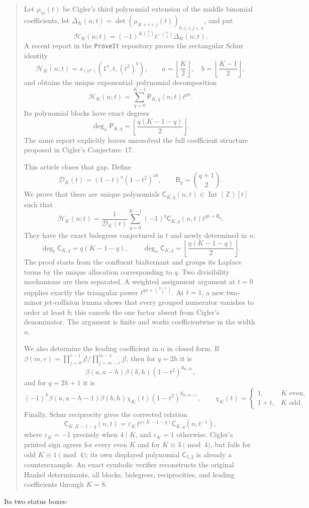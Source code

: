 \documentclass[11pt]{article}
\theoremstyle{definition}
\theoremstyle{remark}
\newcommand{\Z}{\mathbb Z}
\newcommand{\Ht}{\mathcal H}
\newcommand{\IntZ}{\operatorname{Int}(\Z)}
\newcommand{\Den}{\mathcal D}
\newcommand{\Cblock}{\mathsf C}
\newcommand{\Pblock}{\mathsf P}
\newcommand{\Btri}{\mathsf B}
\newcommand{\dq}{\mathsf d}
\newcommand{\epsK}{\varepsilon}
\theoremstyle{definition}
\theoremstyle{plain}
\numberwithin{equation}{section}
\begin{document}
\begin{quote}\small
Let $\mu_m(t)$ be Cigler's third polynomial extension of the middle binomial
coefficients, let $\Delta_K(n;t)=\det(\mu_{K+i+j}(t))_{0\le i,j<n}$, and put
\[
 \Ht_K(n;t)=(-1)^{K\binom n2}t^{-\binom n2}\Delta_K(n;t).
\]
A recent report in the \texttt{ProveIt} repository proves the rectangular
Schur identity
\[
 \Ht_K(n;t)=s_{(n^a)}(1^a,t,(t^2)^b),
 \qquad
 a=\left\lfloor\frac K2\right\rfloor,
 \quad b=\left\lfloor\frac{K-1}{2}\right\rfloor,
\]
and obtains the unique exponential--polynomial decomposition
\[
 \Ht_K(n;t)=\sum_{q=0}^{K-1}\Pblock_{K,q}(n;t)t^{qn}.
\]
Its polynomial blocks have exact degrees
\[
 \deg_n\Pblock_{K,q}
 =\left\lfloor\frac{q(K-1-q)}2\right\rfloor.
\]
The same report explicitly leaves unresolved the full coefficient structure
proposed in Cigler's Conjecture~17.

This article closes that gap.  Define
\[
 \Den_K(t)=(1-t)^a(1-t^2)^{ab},\qquad
 \Btri_q=\binom{q+1}{2}.
\]
We prove that there are unique polynomials
$\Cblock_{K,q}(n,t)\in\IntZ[t]$ such that
\[
 \boxed{\displaystyle
 \Ht_K(n;t)=\frac{1}{\Den_K(t)}
 \sum_{q=0}^{K-1}(-1)^q
 \Cblock_{K,q}(n,t)t^{qn+\Btri_q}.}
\]
They have the exact bidegrees conjectured in $t$ and newly determined in $n$:
\[
 \deg_t\Cblock_{K,q}=q(K-1-q),\qquad
 \deg_n\Cblock_{K,q}=\left\lfloor\frac{q(K-1-q)}2\right\rfloor.
\]
The proof starts from the confluent bialternant and groups its Laplace terms by
the unique allocation corresponding to $q$.  Two divisibility mechanisms are
then separated.  A weighted assignment argument at $t=0$ supplies exactly the
triangular power $t^{qn+\binom{q+1}{2}}$.  At $t=1$, a new two-minor jet-collision
lemma shows that every grouped numerator vanishes to order at least $b$; this
cancels the one factor absent from Cigler's denominator.  The argument is
finite and works coefficientwise in the width $n$.

We also determine the leading coefficient in $n$ in closed form.  If
$\beta(m,r)=\prod_{j=0}^{r-1}j!/\prod_{j=m-r}^{m-1}j!$, then for $q=2h$ it is
\[
 \beta(a,a-h)\beta(b,h)(1-t^2)^{\dq_{K,2h}},
\]
and for $q=2h+1$ it is
\[
 (-1)^h\beta(a,a-h-1)\beta(b,h)\chi_K(t)
 (1-t^2)^{\dq_{K,2h+1}},
 \qquad
 \chi_K(t)=\begin{cases}1,&K\text{ even},\\1+t,&K\text{ odd}.
 \end{cases}
\]
Finally, Schur reciprocity gives the corrected relation
\[
 \boxed{\displaystyle
 \Cblock_{K,K-1-q}(n,t)=\epsK_K\,
 t^{q(K-1-q)}\Cblock_{K,q}(n,t^{-1}),}
\]
where $\epsK_K=-1$ precisely when $4\mid K$, and $\epsK_K=1$ otherwise.
Cigler's printed sign agrees for every even $K$ and for $K\equiv3\pmod4$,
but fails for odd $K\equiv1\pmod4$; its own displayed polynomial
$\Cblock_{5,2}$ is already a counterexample.  An exact symbolic verifier
reconstructs the original Hankel determinants, all blocks, bidegrees,
reciprocities, and leading coefficients through $K=8$.
\end{quote}
Its two status boxes:
\end{document}
